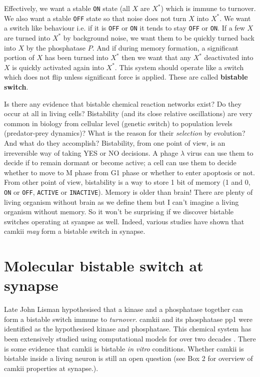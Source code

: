 \documentclass[]{resonance}
\begin{document}
Effectively, we want a stable \texttt{ON} state (all $X$ are $X^*$) which is
immune to turnover. We also want a stable \texttt{OFF} state so that noise does
not turn $X$ into $X^*$.  We want a switch like behaviour i.e. if it is
\texttt{OFF} or \texttt{ON} it tends to stay \texttt{OFF} or \texttt{ON}. If a
few $X$ are turned into $X^*$ by background noise, we want them to be quickly
turned back into $X$ by the phosphatase $P$. And if during memory formation, a
significant portion of $X$ has been turned into $X^*$ then we want that any
$X^*$ deactivated into $X$ is quickly activated again into $X^*$. This system
should operate like a switch which does not flip unless significant force is
applied. These are called \textbf{bistable switch}.

Is there any evidence that bistable chemical reaction networks exist? Do they
occur at all in living cells?  Bistability (and its close relative oscillations)
are very common in biology from cellular level (genetic switch) to population
levels (predator-prey dynamics)?  What is the reason for their \emph{selection}
by evolution? And what do they accomplish? Bistability, from one point of view,
is an irreversible way of taking YES or NO decisions. A phage $\lambda$ virus
can use them to decide if to remain dormant or become active; a cell can use
them to decide whether to move to M phase from G1 phase or whether to enter
apoptosis or not. From other point of view, bistability is a way to store 1 bit
of memory (1 and 0, \texttt{ON} or \texttt{OFF}, \texttt{ACTIVE} or
\texttt{INACTIVE}). Memory is older than brain! There are plenty of living
organism without brain as we define them but I can't imagine a living organism
without memory. So it won't be surprising if we discover bistable switches
operating at syanpse as well. Indeed, various studies have shown that
\gls{camkii} \emph{may} form a bistable switch in synapse.


\section{Molecular bistable switch at synapse}\label{sec:molecular_switch}

Late John Lisman hypothesised that a kinase and a phosphatase together can form
a bistable switch immune to \emph{turnover}. \gls{camkii} and its phosphatase
\Gls{pp1} were identified as the hypothesised kinase and phosphatase. This
chemical system has been extensively studied using computational models for over
two decades \cite{sandstorm}. There is some evidence that \gls{camkii} is
bistable \emph{in vitro} conditions. Whether \gls{camkii} is bistable inside a
living neuron is still an open question (see Box 2 for overview of \gls{camkii}
properties at synapse.).
\end{document}

